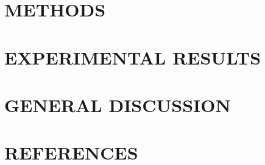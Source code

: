 \documentclass[%
	paper=A4,						%
	twoside=true,					%
	openright,						%
	parskip=full,					%
	chapterprefix=true,				%
	11pt,							%
	headings=normal,				%
	bibliography=totoc,				%
	listof=totoc,					%
	titlepage=on,					%
	captions=tableabove,			%
	draft=false,					%
]{scrreprt}%
\begin{document}
\part{METHODS}



\cleardoublepage
\part{EXPERIMENTAL RESULTS}






\cleardoublepage
\part{GENERAL DISCUSSION}

\cleardoublepage

\part{REFERENCES} \cleardoublepage
{
\renewcommand{\bibfont}{\normalfont\small}
\setlength{\biblabelsep}{0.2pt}
\setlength{\bibitemsep}{0.5\baselineskip plus 0.5\baselineskip}
\printbibliography[nottype=online, heading=none]
}

\cleardoublepage


\cleardoublepage
\end{document}
